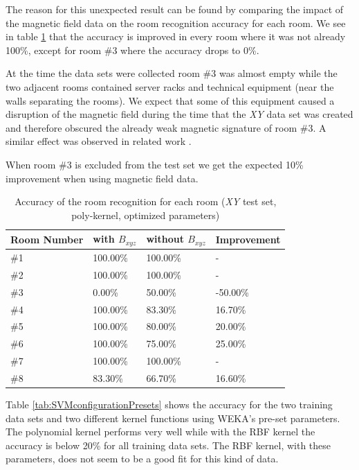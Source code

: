 The reason for this unexpected result can be found by comparing the impact of the magnetic field data on the  room recognition accuracy for each room. We see in table \ref{tab:RoomRecognitionPerRoom} that the accuracy is improved in every room where it was not already 100\%, except for room \#3 where the accuracy drops to 0\%.

At the time the data sets were collected room \#3 was almost empty while the two adjacent rooms contained server racks and technical equipment (near the walls separating the rooms). We expect that some of this equipment caused a disruption of the magnetic field during the time that the \emph{XY} data set was created and therefore obscured the already weak magnetic signature of room \#3. A similar effect was observed in related work \citep{Li2012feasableMagnetic}.

When room \#3 is excluded from the test set we get the expected 10\% improvement when using magnetic field data.

\begin{table}
\centering
\begin{tabular}{l l l l}
\toprule
\textbf{Room Number}&\textbf{with }\boldmath$B_{xyz}$&\textbf{without }\boldmath$B_{xyz}$&\textbf{Improvement} \\
\midrule
\#1&100.00\%&100.00\%&-\\
\#2&100.00\%&100.00\%&-\\
\#3&0.00\%&50.00\%&-50.00\%\\
\#4&100.00\%&83.30\%&16.70\%\\
\#5&100.00\%&80.00\%&20.00\%\\
\#6&100.00\%&75.00\%&25.00\%\\
\#7&100.00\%&100.00\%&-\\
\#8&83.30\%&66.70\%&16.60\%\\
\bottomrule
\end{tabular}
\caption[Room Recognition - Accuracy per room]{Accuracy of the room recognition for each room (\emph{XY} test set, poly-kernel, optimized parameters)}
\label{tab:RoomRecognitionPerRoom}
\end{table}



Table \ref{tab:SVMconfigurationPresets} shows the accuracy for the two training data sets and two different kernel functions using WEKA's pre-set parameters. The polynomial kernel performs very well while with the RBF kernel the accuracy is below 20\% for all training data sets. The RBF kernel, with these parameters, does not seem to be a good fit for this kind of data.

